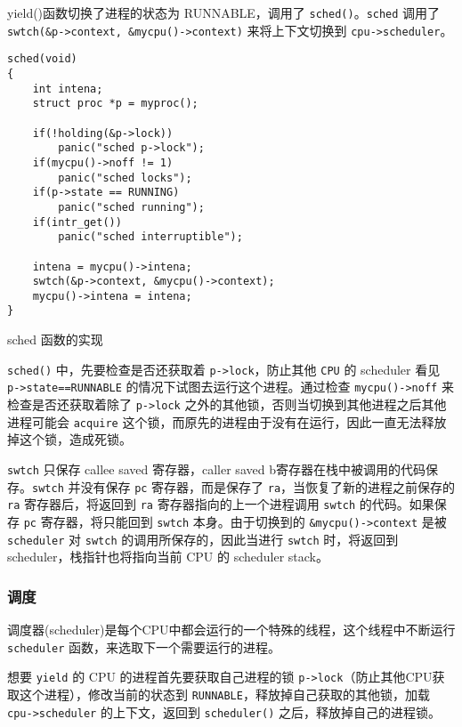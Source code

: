yield()函数切换了进程的状态为 RUNNABLE，调用了 \texttt{sched()}。\texttt{sched} 调用了 \texttt{swtch(\&p->context, \&mycpu()->context)} 来将上下文切换到 \texttt{cpu->scheduler}。

\begin{listing}[!htb]
	\begin{verbatim}
sched(void)
{
    int intena;
    struct proc *p = myproc();
    
    if(!holding(&p->lock))
        panic("sched p->lock");
    if(mycpu()->noff != 1)
        panic("sched locks");
    if(p->state == RUNNING)
        panic("sched running");
    if(intr_get())
        panic("sched interruptible");
    
    intena = mycpu()->intena;
    swtch(&p->context, &mycpu()->context);
    mycpu()->intena = intena;
}
	\end{verbatim}
	\caption{sched 函数的实现}\label{lst:sched}
\end{listing}

\texttt{sched()} 中，先要检查是否还获取着 \texttt{p->lock}，防止其他 \texttt{CPU} 的 scheduler 看见 \texttt{p->state==RUNNABLE} 的情况下试图去运行这个进程。通过检查 \texttt{mycpu()->noff} 来检查是否还获取着除了 \texttt{p->lock} 之外的其他锁，否则当切换到其他进程之后其他进程可能会 \texttt{acquire} 这个锁，而原先的进程由于没有在运行，因此一直无法释放掉这个锁，造成死锁。

\texttt{swtch} 只保存 callee saved 寄存器，caller saved b寄存器在栈中被调用的代码保存。\texttt{swtch} 并没有保存 \texttt{pc} 寄存器，而是保存了 \texttt{ra}，当恢复了新的进程之前保存的 \texttt{ra} 寄存器后，将返回到 \texttt{ra} 寄存器指向的上一个进程调用 \texttt{swtch} 的代码。如果保存 \texttt{pc} 寄存器，将只能回到 \texttt{swtch} 本身。由于切换到的 \texttt{\&mycpu()->context} 是被\texttt{scheduler} 对 \texttt{swtch} 的调用所保存的，因此当进行 \texttt{swtch} 时，将返回到 scheduler，栈指针也将指向当前 CPU 的 scheduler stack。

\subsubsection{调度}

调度器(scheduler)是每个CPU中都会运行的一个特殊的线程，这个线程中不断运行 \texttt{scheduler} 函数，来选取下一个需要运行的进程。

想要 \texttt{yield} 的 CPU 的进程首先要获取自己进程的锁 \texttt{p->lock}（防止其他CPU获取这个进程），修改当前的状态到 \texttt{RUNNABLE}，释放掉自己获取的其他锁，加载 \texttt{cpu->scheduler} 的上下文，返回到 \texttt{scheduler()} 之后，释放掉自己的进程锁。


